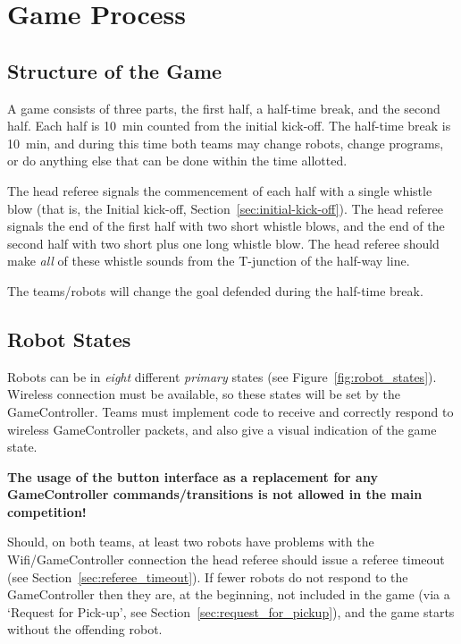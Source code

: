 \section{Game Process}
\label{sec:game_process}

\subsection{Structure of the Game}
\label{sec:game_struct}

A game consists of three parts, the first half, a half-time break, and the second half. Each half is \qty{10}{\minute} counted from the initial kick-off.
The half-time break is \qty{10}{\minute}, and during this time both teams may change robots, change programs, or do anything else that can be done within the time allotted.

The head referee signals the commencement of each half with a single whistle blow (that is, the Initial kick-off, \cf Section~\ref{sec:initial-kick-off}).
The head referee signals the end of the first half with two short whistle blows, and the end of the second half with two short plus one long whistle blow.
The head referee should make \textit{all} of these whistle sounds from the T-junction of the half-way line.

The teams/robots will change the goal defended during the half-time break.

\subsection{Robot States}
\label{sec:robot_states}

Robots can be in \textit{eight} different \emph{primary} states (see Figure~\ref{fig:robot_states}). Wireless connection must be available, so these states will be set by the GameController. Teams must implement code to receive and correctly respond to wireless GameController packets, and also give a visual indication of the game state.

\textbf{The usage of the button interface as a replacement for any GameController commands/transitions is not allowed in the main competition!}

Should, on both teams, at least two robots have problems with the Wifi/GameController connection the head referee should issue a referee timeout (see Section~\ref{sec:referee_timeout}).
If fewer robots do not respond to the GameController then they are, at the beginning, not included in the game (via a `Request for Pick-up', see Section~\ref{sec:request_for_pickup}), and the game starts without the offending robot.

